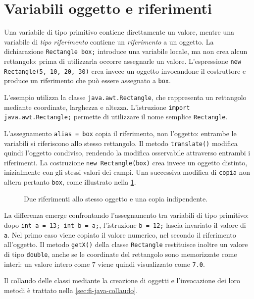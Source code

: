 \section{Variabili oggetto e riferimenti}
\label{sec:fi-java-riferimenti}

Una variabile di tipo primitivo contiene direttamente un valore,
mentre una variabile di \emph{tipo riferimento} contiene un
\emph{riferimento} a un oggetto. La dichiarazione
\texttt{Rectangle box;} introduce una variabile locale, ma non
crea alcun rettangolo: prima di utilizzarla occorre assegnarle
un valore. L'espressione \texttt{new Rectangle(5, 10, 20, 30)}
crea invece un oggetto invocandone il costruttore e produce
un riferimento che può essere assegnato a \texttt{box}.

L'esempio utilizza la classe \texttt{java.awt.Rectangle}, che
rappresenta un rettangolo mediante coordinate, larghezza e
altezza. L'istruzione \texttt{import java.awt.Rectangle;}
permette di utilizzare il nome semplice \texttt{Rectangle}.



L'assegnamento \texttt{alias = box} copia il riferimento, non
l'oggetto: entrambe le variabili si riferiscono allo stesso
rettangolo. Il metodo \texttt{translate()} modifica quindi
l'oggetto condiviso, rendendo la modifica osservabile attraverso
entrambi i riferimenti. La costruzione
\texttt{new Rectangle(box)} crea invece un oggetto distinto,
inizialmente con gli stessi valori dei campi. Una successiva
modifica di \texttt{copia} non altera pertanto \texttt{box},
come illustrato nella \cref{fig:fi-java-alias-copia}.

\begin{figure}[htbp]
  \centering
  
  \caption{Due riferimenti allo stesso oggetto e una copia indipendente.}
  \label{fig:fi-java-alias-copia}
\end{figure}

La differenza emerge confrontando l'assegnamento tra variabili
di tipo primitivo: dopo \texttt{int a = 13; int b = a;},
l'istruzione \texttt{b = 12;} lascia invariato il valore
di \texttt{a}. Nel primo caso viene copiato il valore
numerico, nel secondo il riferimento all'oggetto.
Il metodo \texttt{getX()} della classe \texttt{Rectangle}
restituisce inoltre un valore di tipo \texttt{double},
anche se le coordinate del rettangolo sono memorizzate come
interi: un valore intero come \(7\) viene quindi visualizzato
come \texttt{7.0}.

Il collaudo delle classi mediante la creazione di oggetti e
l'invocazione dei loro metodi è trattato nella
\cref{sec:fi-java-collaudo}.
